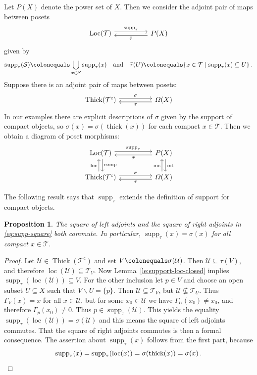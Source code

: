 \documentclass{amsart}[a4]
\newtheorem{proposition}[theorem]{Proposition}
\theoremstyle{definition}
\theoremstyle{remark}
\numberwithin{equation}{section}
\newcommand{\comp}{\operatorname{comp}}
\newcommand{\inc}{\operatorname{inc}}
\newcommand{\loc}{\operatorname{loc}}
\newcommand{\Loc}{\operatorname{Loc}}
\newcommand{\supp}{\operatorname{supp}}
\newcommand{\thick}{\operatorname{thick}}
\newcommand{\Thick}{\operatorname{Thick}}
\newcommand{\cat}{\mathcal}
\let\Gamma\varGamma
\let\Omega\varOmega
\begin{document}
Let $P(X)$ denote the power set of $X$. Then we
consider the adjoint pair of maps between posets
\begin{equation*}\label{eq:supp-tau-bar}
\begin{tikzcd}
\Loc(\cat T) \ar[rr,yshift=2.5,"\supp_\tau"] &&  \ar[ll,yshift=-2.5,"\bar\tau"]
P(X)
\end{tikzcd}
\end{equation*}
given by
\[
\supp_\tau(\cat S)\colonequals\bigcup_{x\in\cat S}\supp_\tau(x)\quad\text{and}\quad
  \bar\tau(U)\colonequals\{x\in\cat T\mid\supp_\tau(x)\subseteq U\}\,.
\]
Suppose there is an adjoint pair of maps between posets:
\begin{equation*}
\begin{tikzcd}
\Thick(\cat T^{\mathrm c}) \ar[rr,yshift=2.5,"\sigma"] &&  \ar[ll,yshift=-2.5,"\tau"]\Omega(X)
\end{tikzcd}
\end{equation*}
In our examples there are explicit descriptions of $\sigma$ given by
the support of compact objects, so $\sigma(x)=\sigma(\thick(x))$ for
each compact $x\in\cat T$.  Then we obtain a diagram of poset
morphisms:
\begin{equation}\label{eq:supp-square}
\begin{tikzcd}
\Loc(\cat T) \ar[rr,yshift=2.5,"\supp_\tau"] \ar[d,xshift=2.5,"\comp"] &&
\ar[ll,yshift=-2.5,"\bar\tau"] P(X) \ar[d,xshift=2.5,"\mathrm{int}"]\\
\Thick(\cat T^{\mathrm c}) \ar[u,xshift=-2.5,"\loc"] \ar[rr,yshift=2.5,"\sigma"]&&
\ar[ll,yshift=-2.5,"\tau"]\ar[u,xshift=-2.5,"\inc"]\Omega(X)
\end{tikzcd}
\end{equation}

The following result says that $\supp_\tau$ extends the definition of
support for compact objects.

\begin{proposition}\label{pr:supp-square}
  The square of left adjoints and the square of right adjoints in
  \eqref{eq:supp-square} both commute. In particular,
  $\supp_\tau(x)=\sigma(x)$ for all compact $x\in\cat T$.
\end{proposition}
\begin{proof}
  Let $\cat U\in\Thick(\cat T^{\mathrm c})$ and set
  $V\colonequals\sigma(\cat U)$. Then $\cat U\subseteq\tau(V)$, and
  therefore $\loc(\cat U)\subseteq\cat T_V$.  Now
  Lemma~\ref{le:support-loc-closed} implies
  $\supp_\tau(\loc(\cat U))\subseteq V$. For the other inclusion let
  $p\in V$ and choose an open subset $U\subseteq X$ such that
  $V\smallsetminus U=\{p\}$. Then $\cat U\subseteq \cat T_V$, but
  $\cat U\not\subseteq \cat T_U$. Thus $\Gamma_V(x)=x$ for all
  $x\in\cat U$, but for some $x_0\in\cat U$ we have
  $\Gamma_U(x_0)\neq x_0$, and therefore $\Gamma_p(x_0)\neq 0$. Thus
  $p\in\supp_\tau(\cat U)$. This yields the equality
  $\supp_\tau(\loc(\cat U))=\sigma(\cat U)$ and this means the square of left
  adjoints commutes.  That the square of right adjoints commutes is then a
  formal consequence. The assertion about $\supp_\tau(x)$ follows from
  the first part, because
  \[\supp_\tau(x)=\supp_\tau(\loc(x))=\sigma(\thick(x))=\sigma(x)\,.\qedhere\]
\end{proof}
\end{document}
